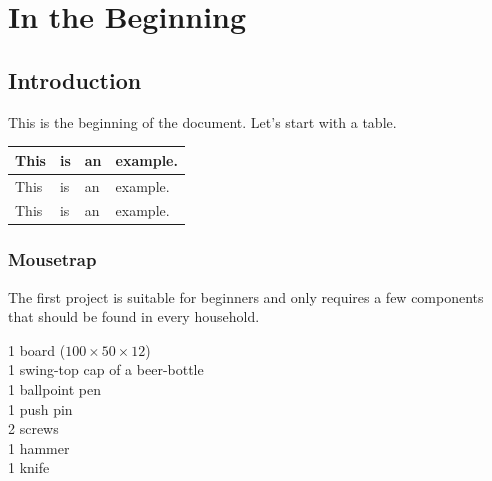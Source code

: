 \documentclass[
    chapterprefix=false,
    appendixprefix=true,
    headings=big,
    headings=optiontotoc,
    listof=chaptergapnone,
    open=right
  ]{scrbook}
\begin{document}
\frontmatter
\setcounter{tocdepth}{\sectiontocdepth}
\tableofcontents
{}
\listoffigures
\listoftables

\mainmatter
\part{In the Beginning}


\chapter{Introduction}

This is the beginning of the document. Let's start with a table.
\begin{table}
    \centering
    \begin{tabular}{llll}
        This & is & an & example.\\ \hline
        This & is & an & example.\\
        This & is & an & example.
    \end{tabular}
\end{table}

\section{Mousetrap}
The first project is suitable for beginners and only requires a few components that should be found in every household.


\begin{flushleft}
1 board ($100\times 50 \times 12$)\\
1 swing-top cap of a beer-bottle\\
1 ballpoint pen\\
1 push pin\\
2 screws\\
1 hammer\\
1 knife
\end{flushleft}
\end{document}
